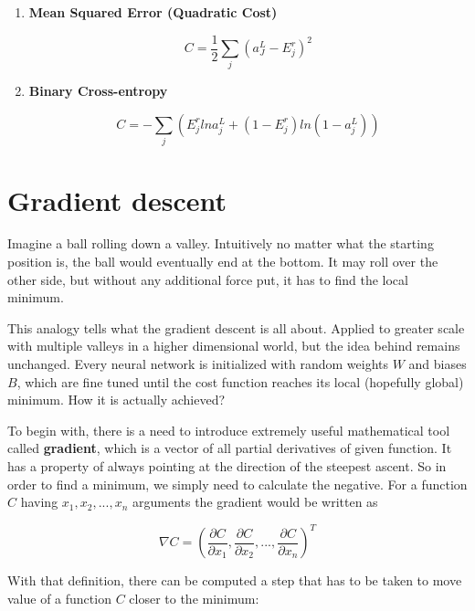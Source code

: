 \begin{enumerate}
    \item \textbf{Mean Squared Error (Quadratic Cost)}
    
    \begin{equation}
        C = \frac{1}{2}\sum_j (a^L_J - E^r_j)^2
    \end{equation}
    
    \item \textbf{Binary Cross-entropy}
    
    \begin{equation}
        C = -\sum_j\left(E_j^rlna_j^L + (1-E_j^r) ln(1 - a_j^L)\right)
    \end{equation}
    
\end{enumerate}

\section{Gradient descent}
\label{sec:gradient-descent}

Imagine a ball rolling down a valley. Intuitively no matter what the starting position is, the ball would eventually end at the bottom. It may roll over the other side, but without any additional force put, it has to find the local minimum. 

This analogy tells what the gradient descent is all about. Applied to greater scale with multiple valleys in a higher dimensional world, but the idea behind remains unchanged. Every neural network is initialized with random weights $W$ and biases $B$, which are fine tuned until the cost function reaches its local (hopefully global) minimum. How it is actually achieved?

To begin with, there is a need to introduce extremely useful mathematical tool called \textbf{gradient}, which is a vector of all partial derivatives of given function. It has a property of always pointing at the direction of the steepest ascent. So in order to find a minimum, we simply need to calculate the negative. For a function $C$ having $x_1, x_2, ..., x_n$ arguments the gradient would be written as 

\begin{equation}
\nabla C = \left(\frac{\partial C}{\partial x_1}, \frac{\partial C}{\partial x_2}, ..., \frac{\partial C}{\partial x_n}\right)^T
\end{equation}

With that definition, there can be computed a step that has to be taken to move value of a function $C$ closer to the minimum:

